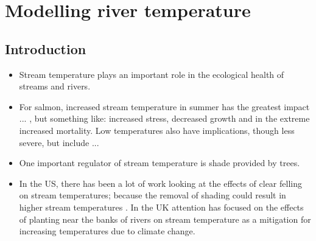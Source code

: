 

\newcommand{\degrees}{${}^\text{o}$}

\graphicspath{{figures/}}

\setcounter{chapter}{3}
\chapter{Modelling river temperature} 





\section{Introduction}

\begin{itemize}
  \item Stream temperature plays an important role in the ecological health of streams and rivers.
  
  \item For salmon, increased stream temperature in summer has the greatest impact ... , but something like:  increased stress, decreased growth and in the extreme increased mortality.   Low temperatures also have implications, though less severe, but include ...

  \item One important regulator of stream temperature is shade provided by trees.  

  \item In the US, there has been a lot of work looking at the effects of clear felling on stream temperatures; because the removal of shading could result in higher stream temperatures .  In the UK attention has focused on the effects of planting near the banks of rivers on stream temperature as a mitigation for increasing temperatures due to climate change.
\end{itemize}





